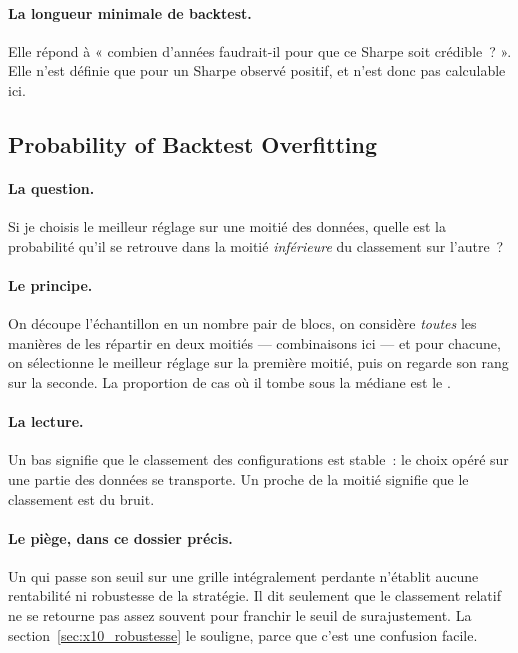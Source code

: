 \paragraph{La longueur minimale de backtest.} Elle répond à « combien
d'années faudrait-il pour que ce Sharpe soit crédible~? ». Elle n'est définie
que pour un Sharpe observé positif, et n'est donc pas calculable ici.

\subsection{Probability of Backtest Overfitting}

\paragraph{La question.} Si je choisis le meilleur réglage sur une moitié des
données, quelle est la probabilité qu'il se retrouve dans la moitié
\emph{inférieure} du classement sur l'autre~?

\paragraph{Le principe.} On découpe l'échantillon en un nombre pair de blocs,
on considère \emph{toutes} les manières de les répartir en deux moitiés ---
\XTenPBOSplits{} combinaisons ici --- et pour chacune, on sélectionne le
meilleur réglage sur la première moitié, puis on regarde son rang sur la
seconde. La proportion de cas où il tombe sous la médiane est le .

\paragraph{La lecture.} Un  bas signifie que le classement des
configurations est stable~: le choix opéré sur une partie des données se
transporte. Un  proche de la moitié signifie que le classement est
du bruit.

\paragraph{Le piège, dans ce dossier précis.} Un  qui passe son
seuil sur une grille intégralement perdante n'établit aucune rentabilité ni
robustesse de la stratégie. Il dit seulement que le classement relatif
ne se retourne pas assez souvent pour franchir le seuil de surajustement. La
section~\ref{sec:x10_robustesse} le souligne, parce que c'est une confusion
facile.

